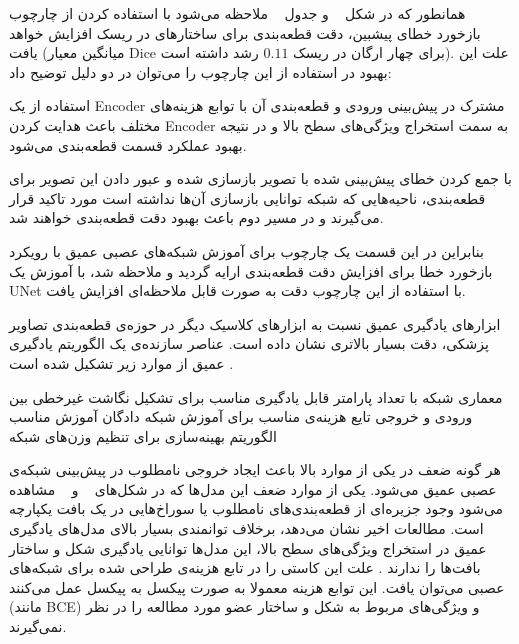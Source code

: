 همانطور که در شکل ~ و جدول ~ ملاحظه‌ می‌شود با استفاده کردن از چارچوب بازخورد خطای پیشبین، دقت قطعه‌بندی برای ساختارهای در ریسک افزایش خواهد یافت (میانگین معیار Dice برای چهار ارگان در ریسک $0.11$ رشد داشته است). علت این بهبود در استفاده از این چارچوب را می‌توان در دو دلیل توضیح داد:

 استفاده از یک Encoder مشترک در پیش‌بینی ورودی و قطعه‌بندی آن با توابع هزینه‌های مختلف باعث هدایت کردن Encoder به سمت استخراج ویژگی‌های سطح بالا و در نتیجه بهبود عملکرد قسمت‌ قطعه‌بندی می‌شود.

 با جمع کردن خطای پیش‌بینی شده با تصویر بازسازی شده و عبور دادن این تصویر برای قطعه‌بندی، ناحیه‌هایی که شبکه توانایی بازسازی آن‌ها نداشته است مورد تاکید قرار می‌گیرند و در مسیر دوم باعث بهبود دقت قطعه‌بندی خواهند شد.

بنابراین در این قسمت یک چارچوب برای آموزش شبکه‌های عصبی عمیق با رویکرد بازخورد خطا برای افزایش دقت قطعه‌بندی ارایه گردید و ملاحظه شد، با آموزش یک UNet با استفاده از این چارچوب دقت به صورت قابل ملاحظه‌ای افزایش یافت.

ابزارهای یادگیری عمیق نسبت به ابزارهای کلاسیک دیگر در حوزه‌ی قطعه‌بندی تصاویر پزشکی، دقت بسیار بالاتری نشان داده است. عناصر سازنده‌ی یک الگوریتم یادگیری عمیق از موارد زیر تشکیل شده است .

 معماری شبکه با تعداد پارامتر قابل یادگیری مناسب برای تشکیل نگاشت غیرخطی بین ورودی و خروجی
 تایع هزینه‌ی مناسب برای آموزش شبکه
 دادگان آموزش مناسب 
 الگوریتم بهینه‌سازی برای تنظیم وزن‌های شبکه

هر گونه ضعف در یکی از موارد بالا باعث ایجاد خروجی نامطلوب در پیش‌بینی شبکه‌ی عصبی عمیق می‌شود. یکی از موارد ضعف این مدل‌ها که در شکل‌های ~ و ~ مشاهده می‌شود وجود جزیره‌ای‌ از قطعه‌بندی‌های نامطلوب یا سوراخ‌هایی در یک بافت یکپارچه است. مطالعات اخیر نشان می‌دهد، برخلاف توانمندی بسیار بالای مدل‌های یادگیری عمیق در استخراج ویژگی‌های سطح بالا، این مدل‌ها توانایی یادگیری شکل و ساختار بافت‌ها را ندارند . علت این کاستی را در تابع هزینه‌ی طراحی شده برای شبکه‌های عصبی می‌توان یافت. این توابع هزینه معمولا به صورت پیکسل به پیکسل عمل می‌کنند (مانند BCE) و ویژگی‌های مربوط به شکل و ساختار عضو مورد مطالعه را در نظر نمی‌گیرند.

